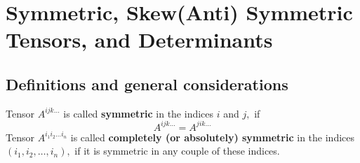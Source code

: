 \section{Symmetric, Skew(Anti) Symmetric Tensors, and Determinants}
\subsection{Definitions and general considerations}
Tensor $A^{i j k \ldots}$ is called \textbf{symmetric} in the indices $i$ and $j,$ if
\begin{equation}
A^{i j k \ldots}=A^{j i k \ldots}
\end{equation}
Tensor $A^{i_{1} i_{2} \ldots i_{n}}$ is called \textbf{completely (or absolutely) symmetric} in the indices $\left(i_{1}, i_{2}, \ldots, i_{n}\right),$ if it is symmetric in any couple of these indices. 

